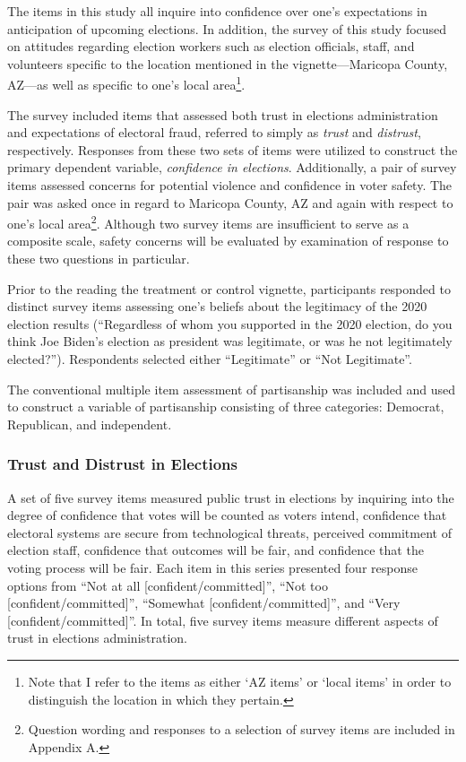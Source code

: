 \documentclass[
  12pt,
  letterpaper,
]{article}
\begin{document}
The items in this study all inquire into confidence over one's
expectations in anticipation of upcoming elections. In addition, the
survey of this study focused on attitudes regarding election workers
such as election officials, staff, and volunteers specific to the
location mentioned in the vignette---Maricopa County, AZ---as well as
specific to one's local area\footnote{Note that I refer to the items as
  either `AZ items' or `local items' in order to distinguish the
  location in which they pertain.}.

The survey included items that assessed both trust in elections
administration and expectations of electoral fraud, referred to simply
as \emph{trust} and \emph{distrust}, respectively. Responses from these
two sets of items were utilized to construct the primary dependent
variable, \emph{confidence in elections}. Additionally, a pair of survey
items assessed concerns for potential violence and confidence in voter
safety. The pair was asked once in regard to Maricopa County, AZ and
again with respect to one's local area\footnote{Question wording and
  responses to a selection of survey items are included in Appendix A.}.
Although two survey items are insufficient to serve as a composite
scale, safety concerns will be evaluated by examination of response to
these two questions in particular.

Prior to the reading the treatment or control vignette, participants
responded to distinct survey items assessing one's beliefs about the
legitimacy of the 2020 election results (``Regardless of whom you
supported in the 2020 election, do you think Joe Biden's election as
president was legitimate, or was he not legitimately elected?'').
Respondents selected either ``Legitimate'' or ``Not Legitimate''.

The conventional multiple item assessment of partisanship was included
and used to construct a variable of partisanship consisting of three
categories: Democrat, Republican, and independent.

\subsubsection{Trust and Distrust in
Elections}\label{trust-and-distrust-in-elections}

A set of five survey items measured public trust in elections by
inquiring into the degree of confidence that votes will be counted as
voters intend, confidence that electoral systems are secure from
technological threats, perceived commitment of election staff,
confidence that outcomes will be fair, and confidence that the voting
process will be fair. Each item in this series presented four response
options from ``Not at all {[}confident/committed{]}'', ``Not too
{[}confident/committed{]}'', ``Somewhat {[}confident/committed{]}'', and
``Very {[}confident/committed{]}''. In total, five survey items measure
different aspects of trust in elections administration.
\end{document}
